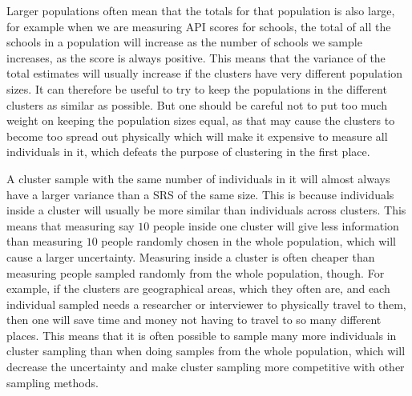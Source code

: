 \documentclass{article}
\begin{document}
Larger populations often mean that the totals for that population is also large,
for example when we are measuring API scores for schools, the total of all the
schools in a population will increase as the number of schools we sample
increases, as the score is always positive. This means that the variance of the
total estimates will usually increase if the clusters have very different
population sizes. It can therefore be useful to try to keep the populations in
the different clusters as similar as possible. But one should be careful not to put
too much weight on keeping the population sizes equal, as that may cause
the clusters to become too spread out physically which will make it expensive to
measure all individuals in it, which defeats the purpose of clustering
in the first place.

A cluster sample with the same number of individuals in it will
almost always have a larger variance than a SRS of the same size. This is
because individuals inside a cluster will usually be more similar than
individuals across clusters. This means that measuring say \(10\) people inside
one cluster will give less information than measuring \(10\) people randomly
chosen in the whole population, which will cause a larger uncertainty. Measuring
inside a cluster is often cheaper than measuring people sampled randomly from
the whole population, though. For example, if the clusters are geographical areas,
which they often are, and each individual sampled needs a researcher or
interviewer to physically travel to them, then one will save time and money
not having to travel to so many different places. This means that it is often possible to sample
many more individuals in cluster sampling than when doing samples from the whole
population, which will decrease the uncertainty and make cluster sampling more
competitive with other sampling methods.
\end{document}
